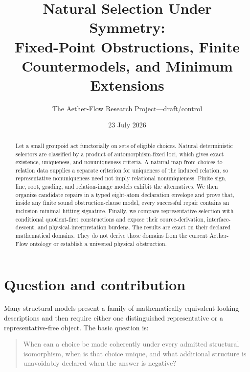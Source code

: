 \documentclass[11pt]{article}
\title{Natural Selection Under Symmetry:\\
Fixed-Point Obstructions, Finite Countermodels, and Minimum Extensions}
\author{The Aether-Flow Research Project---draft/control}
\date{23 July 2026}
\theoremstyle{definition}
\begin{document}
\maketitle

\begin{center}
\end{center}

\begin{abstract}
Let a small groupoid act functorially on sets of eligible choices.  Natural
deterministic selectors are classified by a product of automorphism-fixed
loci, which gives exact existence, uniqueness, and nonuniqueness criteria.
A natural map from choices to relation data supplies a separate criterion for
uniqueness of the induced relation, so representative nonuniqueness need not
imply relational nonuniqueness.  Finite sign, line, root, grading, and
relation-image models exhibit the alternatives.  We then organize candidate
repairs in a typed eight-atom declaration envelope and prove that, inside any
finite sound obstruction-clause model, every successful repair contains an
inclusion-minimal hitting signature.  Finally, we compare representative
selection with conditional quotient-first constructions and expose their
source-derivation, interface-descent, and physical-interpretation burdens.
The results are exact on their declared mathematical domains.  They do not
derive those domains from the current Aether-Flow ontology or establish a
universal physical obstruction.
\end{abstract}

\section{Question and contribution}

Many structural models present a family of mathematically equivalent-looking
descriptions and then require either one distinguished representative or a
representative-free object.  The basic question is:
\begin{quote}
When can a choice be made coherently under every admitted structural
isomorphism, when is that choice unique, and what additional structure is
unavoidably declared when the answer is negative?
\end{quote}
\end{document}
